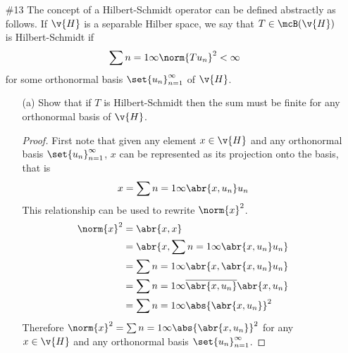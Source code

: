 \documentclass[11pt, oneside]{article}
\begin{document}
\begin{enumerate}
\begin{proof}
    \end{proof}

  \pagebreak
  \item[\#13]
    The concept of a Hilbert-Schmidt operator can be defined abstractly as
    follows.
    If $\v{H}$ is a separable Hilber space, we say that $T \in \mcB(\v{H})$ is
    Hilbert-Schmidt if
    \[
      \sum{n = 1}{\infty}{\norm{Tu_n}^2} < \infty
    \]
    for some orthonormal basis $\set{u_n}_{n = 1}^{\infty}$ of $\v{H}$.
    \begin{enumerate}
      \item[(a)] %
        Show that if $T$ is Hilbert-Schmidt then the sum must be finite for any
        orthonormal basis of $\v{H}$.

        \begin{proof}
          First note that given any element $x \in \v{H}$ and any orthonormal
          basis $\set{u_n}_{n = 1}^{\infty}$, $x$ can be represented as its
          projection onto the basis, that is
          \[
            x = \sum{n = 1}{\infty}{\abr{x, u_n} u_n}
          \]
          This relationship can be used to rewrite $\norm{x}^2$.
          \begin{align*}
            \norm{x}^2 &= \abr{x, x} \\
            &= \abr{x, \sum{n = 1}{\infty}{\abr{x, u_n} u_n}} \\
            &= \sum{n = 1}{\infty}{\abr{x, \abr{x, u_n} u_n}} \\
            &= \sum{n = 1}{\infty}{\overline{\abr{x, u_n}} \abr{x, u_n}} \\
            &= \sum{n = 1}{\infty}{\abs{\abr{x, u_n}}^2} \\
          \end{align*}
          Therefore $\norm{x}^2 = \sum{n = 1}{\infty}{\abs{\abr{x, u_n}}^2}$
          for any $x \in \v{H}$ and any orthonormal basis
          $\set{u_n}_{n = 1}^{\infty}$.


\end{proof}
\end{enumerate}
\end{enumerate}
\end{document}
